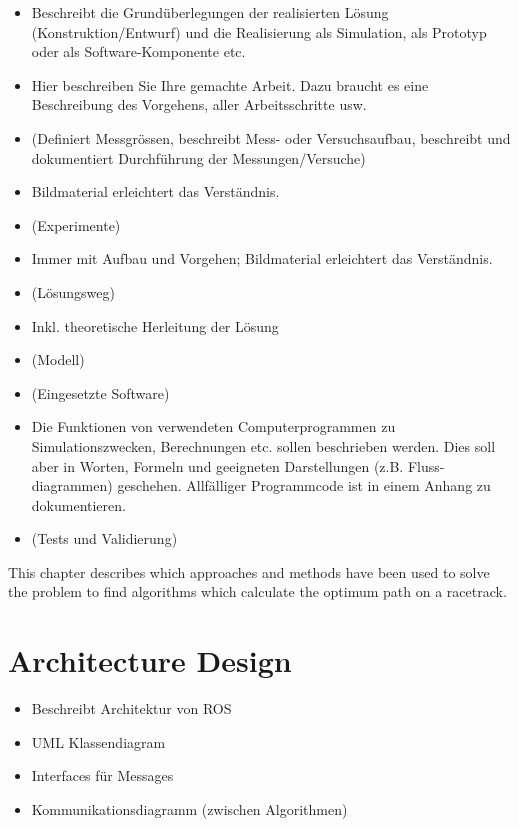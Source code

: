 \begin{itemize}
    \item Beschreibt die Grundüberlegungen der realisierten Lösung (Konstruktion/Entwurf) und die Realisierung als Simulation, als Prototyp oder als Software-Komponente etc.
    \item Hier beschreiben Sie Ihre gemachte Arbeit. Dazu braucht es eine Beschreibung des Vorgehens, aller Arbeitsschritte usw.
    \item (Definiert Messgrössen, beschreibt Mess- oder Versuchsaufbau, beschreibt und dokumentiert Durchführung der Messungen/Versuche)
    \item Bildmaterial erleichtert das Verständnis.
    \item (Experimente)
    \item Immer mit Aufbau und Vorgehen; Bildmaterial erleichtert das Verständnis.
    \item (Lösungsweg)
    \item Inkl. theoretische Herleitung der Lösung
    \item (Modell)
    \item (Eingesetzte Software)
    \item Die Funktionen von verwendeten Computerprogrammen zu Simulationszwecken, Berechnungen etc. sollen beschrieben werden. Dies soll aber in Worten, Formeln und geeigneten Darstellungen (z.B. Fluss- diagrammen) geschehen. Allfälliger Programmcode ist in einem Anhang zu dokumentieren.
    \item (Tests und Validierung)
\end{itemize}

This chapter describes which approaches and methods have been used to solve the problem to find algorithms which calculate the optimum path on a racetrack. 

\section{Architecture Design} \label{sec:Architecture Design}
\begin{itemize}
    \item Beschreibt Architektur von ROS
    \item UML Klassendiagram
    \item Interfaces für Messages
    \item Kommunikationsdiagramm (zwischen Algorithmen)
\end{itemize}

